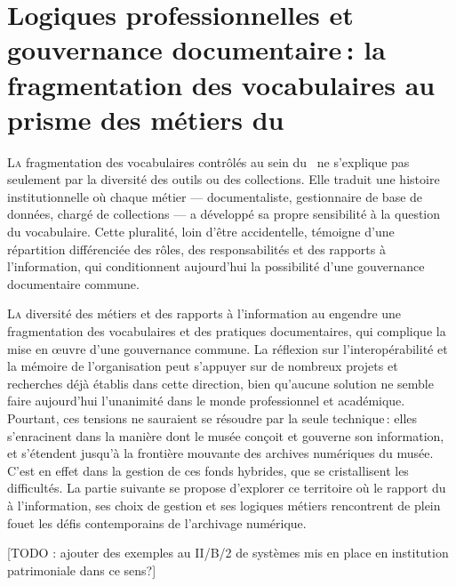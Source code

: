 \chapter[Diversité des métiers et fragmentation documentaire]{\label{II-B}Logiques professionnelles et gouvernance documentaire : la fragmentation des vocabulaires au prisme des métiers du \mae}

\lettrine{L}a fragmentation des vocabulaires contrôlés au sein du \maelong~ne s'explique pas seulement par la diversité des outils ou des collections. Elle traduit une histoire institutionnelle où chaque métier — documentaliste, gestionnaire de base de données, chargé de collections — a développé sa propre sensibilité à la question du vocabulaire. Cette pluralité, loin d'être accidentelle, témoigne d'une répartition différenciée des rôles, des responsabilités et des rapports à l'information, qui conditionnent aujourd'hui la possibilité d'une gouvernance documentaire commune.




\bigskip
\bigskip
\bigskip

\lettrine{L}{a} diversité des métiers et des rapports à l'information au \mae engendre une fragmentation des vocabulaires et des pratiques documentaires, qui complique la mise en œuvre d'une gouvernance commune. La réflexion sur l'interopérabilité et la mémoire de l'organisation peut s'appuyer sur de nombreux projets et recherches déjà établis dans cette direction, bien qu'aucune solution ne semble faire aujourd'hui l'unanimité dans le monde professionnel et académique. Pourtant, ces tensions ne sauraient se résoudre par la seule technique : elles s’enracinent dans la manière dont le musée conçoit et gouverne son information, et s’étendent jusqu’à la frontière mouvante des archives numériques du musée. C’est en effet dans la gestion de ces fonds hybrides, que se cristallisent les difficultés. La partie suivante se propose d’explorer ce territoire où le rapport du \mae à l’information, ses choix de gestion et ses logiques métiers rencontrent de plein fouet les défis contemporains de l’archivage numérique.

[TODO : ajouter des exemples au II/B/2 de systèmes mis en place en institution patrimoniale dans ce sens?]